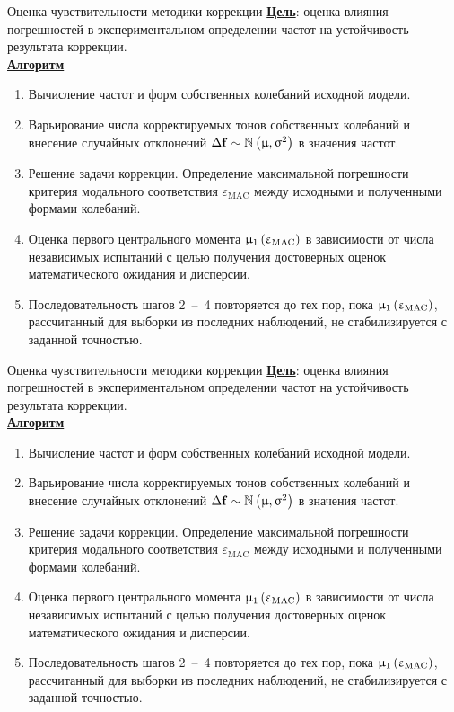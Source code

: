 \begin{frame}{Оценка чувствительности методики коррекции}
	\textbf{\underline{Цель}}: оценка влияния погрешностей в экспериментальном определении частот на устойчивость результата коррекции. \\
	\textbf{\underline{Алгоритм}}
	\begin{enumerate}
		\item Вычисление частот и форм собственных колебаний исходной модели.
		\item Варьирование числа корректируемых тонов собственных колебаний и внесение случайных отклонений $ \Delta \mathbf{f} \sim \mathbb{N} \left( \upmu, \upsigma ^ 2 \right) $ в значения частот. 
		\item Решение задачи коррекции. Определение максимальной погрешности критерия модального соответствия $ \varepsilon_{\mathrm{MAC}} $ между исходными и полученными формами колебаний.
		\item Оценка первого центрального момента $ \upmu_1\left( \upvarepsilon_{\mathrm{MAC}} \right) $ в зависимости от числа независимых испытаний с целью получения достоверных оценок математического ожидания и дисперсии. 
		\item Последовательность шагов 2~--~4 повторяется до тех пор, пока $ \upmu_1\left( \upvarepsilon_{\mathrm{MAC}} \right) $, рассчитанный для выборки из последних наблюдений, не стабилизируется с заданной точностью.
	\end{enumerate}
\end{frame}

\begin{frame}{Оценка чувствительности методики коррекции}
	\textbf{\underline{Цель}}: оценка влияния погрешностей в экспериментальном определении частот на устойчивость результата коррекции. \\
	\textbf{\underline{Алгоритм}}
	\begin{enumerate}
		\item Вычисление частот и форм собственных колебаний исходной модели.
		\item Варьирование числа корректируемых тонов собственных колебаний и внесение случайных отклонений $ \Delta \mathbf{f} \sim \mathbb{N} \left( \upmu, \upsigma ^ 2 \right) $ в значения частот. 
		\item Решение задачи коррекции. Определение максимальной погрешности критерия модального соответствия $ \varepsilon_{\mathrm{MAC}} $ между исходными и полученными формами колебаний.
		\item Оценка первого центрального момента $ \upmu_1\left( \upvarepsilon_{\mathrm{MAC}} \right) $ в зависимости от числа независимых испытаний с целью получения достоверных оценок математического ожидания и дисперсии. 
		\item Последовательность шагов 2~--~4 повторяется до тех пор, пока $ \upmu_1\left( \upvarepsilon_{\mathrm{MAC}} \right) $, рассчитанный для выборки из последних наблюдений, не стабилизируется с заданной точностью.
	\end{enumerate}
\end{frame}

